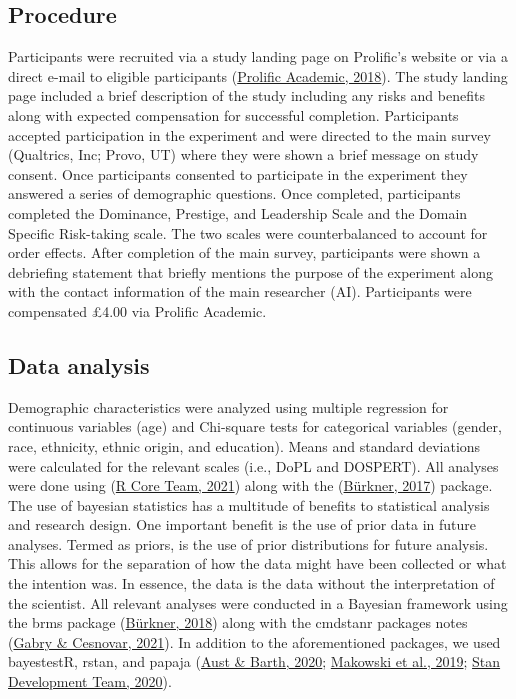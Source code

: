 \documentclass[
  donotrepeattitle,doc, 12pt, a4paper,floatsintext]{apa7}
\begin{document}
\hypertarget{procedure}{%
\subsection{Procedure}\label{procedure}}
Participants were recruited via a study landing page on Prolific's website or via a direct e-mail to eligible participants (\protect\hyperlink{ref-prolificacademic2018}{Prolific Academic, 2018}). The study landing page included a brief description of the study including any risks and benefits along with expected compensation for successful completion. Participants accepted participation in the experiment and were directed to the main survey (Qualtrics, Inc; Provo, UT) where they were shown a brief message on study consent.
Once participants consented to participate in the experiment they answered a series of demographic questions. Once completed, participants completed the Dominance, Prestige, and Leadership Scale and the Domain Specific Risk-taking scale. The two scales were counterbalanced to account for order effects. After completion of the main survey, participants were shown a debriefing statement that briefly mentions the purpose of the experiment along with the contact information of the main researcher (AI). Participants were compensated £4.00 via Prolific Academic.
\hypertarget{data-analysis}{%
\subsection{Data analysis}\label{data-analysis}}
Demographic characteristics were analyzed using multiple regression for continuous variables (age) and Chi-square tests for categorical variables (gender, race, ethnicity, ethnic origin, and education). Means and standard deviations were calculated for the relevant scales (i.e., DoPL and DOSPERT). All analyses were done using (\protect\hyperlink{ref-rcoreteam2021}{R Core Team, 2021}) along with the (\protect\hyperlink{ref-burkner2017}{Bürkner, 2017}) package.
The use of bayesian statistics has a multitude of benefits to statistical analysis and research design. One important benefit is the use of prior data in future analyses. Termed as priors, is the use of prior distributions for future analysis. This allows for the separation of how the data might have been collected or what the intention was. In essence, the data is the data without the interpretation of the scientist.
All relevant analyses were conducted in a Bayesian framework using the brms package (\protect\hyperlink{ref-burkner2018}{Bürkner, 2018}) along with the cmdstanr packages notes (\protect\hyperlink{ref-gabry2021}{Gabry \& Cesnovar, 2021}). In addition to the aforementioned packages, we used bayestestR, rstan, and papaja (\protect\hyperlink{ref-aust2020}{Aust \& Barth, 2020}; \protect\hyperlink{ref-makowski2019}{Makowski et al., 2019}; \protect\hyperlink{ref-standevelopmentteam2020}{Stan Development Team, 2020}).
\end{document}
